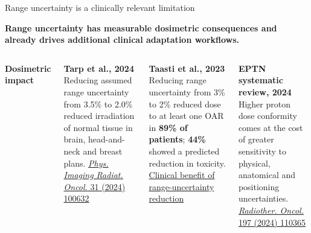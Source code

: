 \documentclass[aspectratio=169,11pt]{beamer}
\begin{document}
\begin{frame}{Range uncertainty is a clinically relevant limitation}

\vspace{-0.05cm}

\begin{center}
{\small\bfseries\color{darkred}
Range uncertainty has measurable dosimetric consequences and already drives additional clinical adaptation workflows.
}
\end{center}

\vspace{0.10cm}

\begin{columns}[T,onlytextwidth]


{\footnotesize\bfseries\color{PTblue}
Dosimetric impact
}

\vspace{0.10cm}

{\tiny

\textbf{Tarp et al., 2024}  
Reducing assumed range uncertainty from 3.5\% to 2.0\% reduced irradiation of normal tissue in brain, head-and-neck and breast plans.  
\href{https://doi.org/10.1016/j.phro.2024.100632}
{\textit{Phys. Imaging Radiat. Oncol.} 31 (2024) 100632}

\vspace{0.16cm}

\textbf{Taasti et al., 2023}  
Reducing range uncertainty from 3\% to 2\% reduced dose to at least one OAR in \textbf{89\% of patients}; \textbf{44\%} showed a predicted reduction in toxicity.  
\href{https://pmc.ncbi.nlm.nih.gov/articles/PMC10461272/}
{Clinical benefit of range-uncertainty reduction}

\vspace{0.16cm}

\textbf{EPTN systematic review, 2024}  
Higher proton dose conformity comes at the cost of greater sensitivity to physical, anatomical and positioning uncertainties.  
\href{https://doi.org/10.1016/j.radonc.2024.110365}
{\textit{Radiother. Oncol.} 197 (2024) 110365}

}



\end{columns}
\end{frame}
\end{document}
